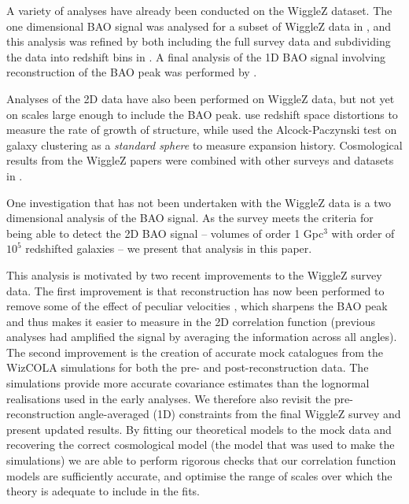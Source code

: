 \documentclass[iop,twocolappendix]{emulateapj}
\begin{document}
A variety of analyses have already been conducted on the WiggleZ dataset. 
The one dimensional BAO signal was analysed for a subset of WiggleZ data in \citet{BlakeDavis2011}, and this analysis was refined by both including the full survey data and subdividing the data into redshift bins in \citet{BlakeKazin2011}. A final analysis of the 1D BAO signal involving reconstruction of the BAO peak was performed by \citet{KazinKoda2014}. 

Analyses of the 2D data have also been performed on WiggleZ data, but not yet on scales large enough to include the BAO peak.  \citet{BlakeBroughColless2011,ContrerasBlake2013} use redshift space distortions to measure the rate of growth  of structure, while \citet{BlakeGlazebrook2011} used the Alcock-Paczynski test on galaxy clustering as a {\em standard sphere} to measure expansion history. Cosmological results from the WiggleZ papers were combined with other surveys and datasets in \citet{Parkinson2012}. %

One investigation that has not been undertaken with the WiggleZ data is a two dimensional analysis of the BAO signal.  As the survey meets the criteria for being able to detect the 2D BAO signal -- volumes of order 1 Gpc$^3$ with order of $10^5$ redshifted galaxies \citep{Tegmark1997,BlakeGlazebrook2003,BlakeParkinson2006} -- we present that analysis in this paper.  

This analysis is motivated by two recent improvements to the WiggleZ survey data.  The first improvement is that reconstruction has now been performed to remove some of the effect of peculiar velocities \citep{KazinKoda2014}, which sharpens the BAO peak and thus makes it  easier to measure in the 2D correlation function (previous analyses had amplified the signal by averaging the information across all angles).  The second improvement is the creation of accurate mock catalogues from the WizCOLA simulations \citep{KodaBlake2015} for both the pre- and post-reconstruction data. The simulations provide more accurate covariance estimates than the lognormal realisations used in the early analyses.  We therefore also revisit the pre-reconstruction angle-averaged (1D) constraints from the final WiggleZ survey and present updated results.  By fitting our theoretical models to the mock data and recovering the correct cosmological model (the model that was used to make the simulations) we are able to perform rigorous checks that our correlation function models are sufficiently accurate, and optimise the range of scales over which the theory is adequate to include in the fits.  
\end{document}
